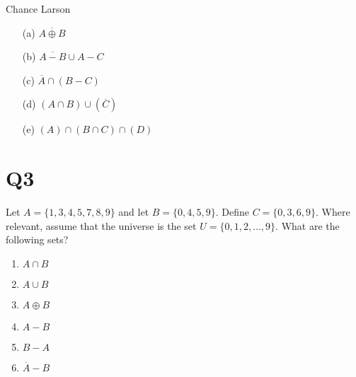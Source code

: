 Chance Larson\documentclass[12pt]{exam}
\begin{document}
\begin{enumerate}
    \item [(a)] $\overline{A \oplus B}$
    \item [(b)] $\overline{A - B} \cup A - C$
    \item [(c)] $\overline{A} \cap (B - C)$
    \item [(d)] $(A \cap B) \cup (\overline{C}) $
    \item [(e)] $(A) \cap (B \cap C) \cap (D)$
\end{enumerate}


\section{Q3}
Let $A = \{1, 3, 4, 5, 7, 8, 9\}$ and let $B = \{0, 4, 5, 9\}.$ Define $C = \{0, 3, 6, 9\}$. Where relevant, assume that the universe is the set $U = \{0, 1, 2, \ldots, 9\}$. What are the following sets?

\begin{enumerate}
    \item $A \cap B$
    \item $A \cup B$
    \item $A \oplus B$
    \item $A - B$
    \item $B - A$
    \item $\overline{A} - B$
\end{enumerate}
\end{document}
